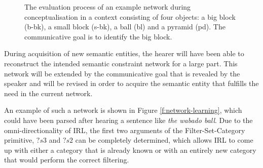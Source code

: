 \begin{figure}[htbp]
\centering
{}
\caption[Evaluation process of an example constraint
network]{ The evaluation process of an
  example network  during
  conceptualisation in a context consisting of four objects: a big
  block (b-bk), a small block (s-bk), a ball (bl) and a pyramid
  (pd). The communicative goal is to identify the big block.}
\label{f:evaluation}
\end{figure}

During acquisition of new semantic entities, the hearer will have been
able to reconstruct the intended semantic constraint network for a
large part. This network will be extended by the communicative goal
that is revealed by the speaker and will be revised in order to
acquire the semantic entity that fulfills the need in the current
network.

An example of such a network is shown in Figure
\ref{f:network-learning}, which could have been parsed after hearing a
sentence like \textit{the wabado ball}. Due to the omni-directional\-ity of
IRL, the first two arguments of the {\sc Filter-Set-Category}
primitive, $?s3$ and $?s2$ can be completely determined, which allows
IRL to come up with either a category that is already known or with an
entirely new category that would perform the correct filtering.

